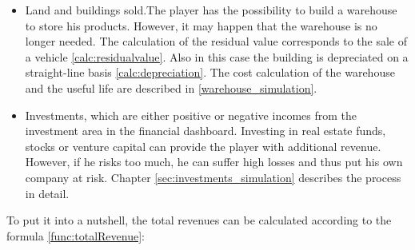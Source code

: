 \begin{itemize}
    \item Land and buildings sold.The player has the possibility to build a warehouse to store his products. However, it may happen that the warehouse is no longer needed. The calculation of the residual value corresponds to the sale of a vehicle \ref{calc:residualvalue}. Also in this case the building is depreciated on a straight-line basis \ref{calc:depreciation}. The cost calculation of the warehouse and the useful life are described in \ref{warehouse_simulation}.
  
    \item Investments, which are either positive or negative incomes from the investment area in the financial dashboard. Investing in real estate funds, stocks or venture capital can provide the player with additional revenue. However, if he risks too much, he can suffer high losses and thus put his own company at risk. Chapter \ref{sec:investments_simulation} describes the process in detail.
\end{itemize}

To put it into a nutshell, the total revenues can be calculated according to the formula \ref{func:totalRevenue}:

\begin{equation}
\label{func:totalRevenue}
\end{equation}

